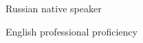 

\begin{cvskills}

  \cvskill
    {Russian}
    {native speaker}
    
  \cvskill
    {English}
    {professional proficiency}

\end{cvskills}
